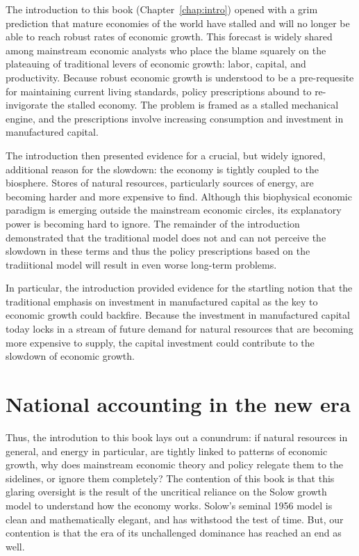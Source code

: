 The introduction to this book (Chapter~\ref{chap:intro}) opened with
a grim prediction that mature economies of the world have stalled and will no longer be able
to reach robust rates of economic growth. This forecast  is widely shared among mainstream economic
analysts who place the blame squarely on
the plateauing of traditional levers of economic growth: 
labor, capital, and productivity. Because
robust economic growth is understood to be a pre-requesite
for maintaining current living standards, policy prescriptions abound
to re-invigorate the stalled economy. The problem is
framed as a stalled mechanical engine, and the prescriptions
involve increasing consumption and investment in 
manufactured capital.

 The introduction
then presented evidence for a crucial, but widely ignored, additional reason for the 
slowdown: the economy is tightly coupled to the biosphere. Stores of natural resources, 
particularly sources of energy,
are becoming harder and more expensive
to find. Although this biophysical economic paradigm is emerging outside the
mainstream economic circles, its explanatory power is becoming
hard to ignore.  The remainder of the
introduction demonstrated that the traditional model 
does not and can not 
 perceive the slowdown
in these terms and thus the policy prescriptions based on the 
tradiitional model will result in even worse long-term problems.

In particular, the introduction provided evidence for the startling notion that the traditional emphasis on
investment in manufactured capital as the key to economic growth could backfire.
Because the investment in manufactured capital today locks in a stream of future
demand for natural resources that are becoming more expensive to supply,
the capital investment could contribute to the slowdown of economic growth.

\section{National accounting in the new era}
\label{sec:new_accounting}

Thus, the introdution to this book lays out a conundrum: 
if natural resources in general, and energy in particular,  are 
tightly linked to patterns of economic growth, why
does mainstream economic theory and policy relegate them to 
the sidelines, or ignore them completely? 
The contention of this book is that this glaring oversight is the result 
of  the uncritical reliance on the Solow growth model
to understand how the economy works.  Solow's seminal 1956 model is clean and
mathematically elegant, and has withstood the test of time. But, our contention
is that the era of its unchallenged dominance has reached an end as well.

